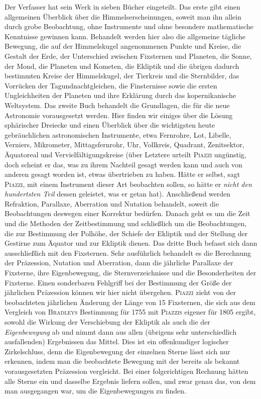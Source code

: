 Der Verfasser hat sein Werk in sieben Bücher eingeteilt. Das erste gibt einen allgemeinen Überblick über die Himmelserscheinungen, soweit man ihn allein durch grobe Beobachtung, ohne Instrumente und ohne besondere mathematische Kenntnisse gewinnen kann. Behandelt werden hier also die allgemeine tägliche Bewegung, die auf der Himmelskugel angenommenen Punkte und Kreise, die Gestalt der Erde, der Unterschied zwischen Fixsternen und Planeten, die Sonne, der Mond, die Planeten und Kometen, die Ekliptik und die übrigen dadurch bestimmten Kreise der Himmelskugel, der Tierkreis und die Sternbilder, das Vorrücken der Tagundnachtgleichen, die Finsternisse sowie die ersten Ungleichheiten der Planeten und ihre Erklärung durch das kopernikanische Weltsystem. Das zweite Buch behandelt die Grundlagen, die für die neue Astronomie vorausgesetzt werden. Hier finden wir einiges über die Lösung sphärischer Dreiecke und einen Überblick über die wichtigsten heute gebräuchlichen astronomischen Instrumente, etwa Fernrohre, Lot, Libelle, Verniers, Mikrometer, Mittagsfernrohr, Uhr, Vollkreis, Quadrant, Zenitsektor, Äquatoreal und Vervielfältigungskreise (über Letztere urteilt \textsc{Piazzi} ungünstig, doch scheint er das, was zu ihrem Nachteil gesagt werden kann und auch von anderen gesagt worden ist, etwas übertrieben zu haben. Hätte er selbst, sagt \textsc{Piazzi}, mit einem Instrument dieser Art beobachten sollen, so hätte er \emph{nicht den hundertsten Teil} dessen geleistet, was er getan hat). Anschließend werden Refraktion, Parallaxe, Aberration und Nutation behandelt, soweit die Beobachtungen deswegen einer Korrektur bedürfen. Danach geht es um die Zeit und die Methoden der Zeitbestimmung und schließlich um die Beobachtungen, die zur Bestimmung der Polhöhe, der Schiefe der Ekliptik und der Stellung der Gestirne zum Äquator und zur Ekliptik dienen. Das dritte Buch befasst sich dann ausschließlich mit den Fixsternen. Sehr ausführlich behandelt es die Berechnung der Präzession, Nutation und Aberration, dann die jährliche Parallaxe der Fixsterne, ihre Eigenbewegung, die Sternverzeichnisse und die Besonderheiten der Fixsterne. Einen sonderbaren Fehlgriff bei der Bestimmung der Größe der jährlichen Präzession können wir hier nicht übergehen. \textsc{Piazzi} zieht von der beobachteten jährlichen Änderung der Länge von 15 Fixsternen, die sich aus dem Vergleich von \textsc{Bradleys} Bestimmung für 1755 mit \textsc{Piazzis} eigener für 1805 ergibt, sowohl die Wirkung der Verschiebung der Ekliptik als auch die der \emph{Eigenbewegung} ab und nimmt dann aus allen (übrigens sehr unterschiedlich ausfallenden) Ergebnissen das Mittel. Dies ist ein offenkundiger logischer Zirkelschluss, denn die Eigenbewegung der einzelnen Sterne lässt sich nur erkennen, indem man die beobachtete Bewegung mit der bereits als bekannt vorausgesetzten Präzession vergleicht. Bei einer folgerichtigen Rechnung hätten alle Sterne ein und dasselbe Ergebnis liefern sollen, und zwar genau das, von dem man ausgegangen war, um die Eigenbewegungen zu finden.

